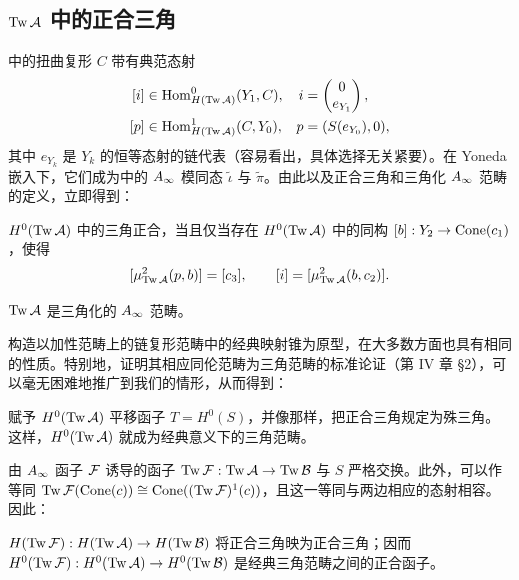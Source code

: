 \clearpage
\subsection{\texorpdfstring{$\operatorname{Tw}\mathcal A$ 中的正合三角}{TwA 中的正合三角}}\label{sec:3q}
中的扭曲复形 $C$ 带有典范态射
\begin{equation}\label{eq:3.30}
\begin{aligned}
\relax[i]&\in\operatorname{Hom}^0_{H(\operatorname{Tw}\mathcal A)}(Y_1,C),&i&=\begin{pmatrix}0\\e_{Y_1}\end{pmatrix},\\
[p]&\in\operatorname{Hom}^1_{H(\operatorname{Tw}\mathcal A)}(C,Y_0),&p&=(S(e_{Y_0}),0),
\end{aligned}
\end{equation}
其中 $e_{Y_k}$ 是 $Y_k$ 的恒等态射的链代表（容易看出，具体选择无关紧要）。在 Yoneda 嵌入下，它们成为中的 $A_\infty$ 模同态 $\tilde\iota$ 与 $\tilde\pi$。由此以及正合三角和三角化 $A_\infty$ 范畴的定义，立即得到：
\begin{lemma}\label{st:3.27}
$H^0(\operatorname{Tw}\mathcal A)$ 中的三角正合，当且仅当存在 $H^0(\operatorname{Tw}\mathcal A)$ 中的同构 $[b]:Y_2\to\operatorname{Cone}(c_1)$，使得
\[
[\mu^2_{\operatorname{Tw}\mathcal A}(p,b)]=[c_3],\qquad [i]=[\mu^2_{\operatorname{Tw}\mathcal A}(b,c_2)].
\]
\end{lemma}
\begin{lemma}\label{st:3.28}
$\operatorname{Tw}\mathcal A$ 是三角化的 $A_\infty$ 范畴。
\end{lemma}
构造以加性范畴上的链复形范畴中的经典映射锥为原型，在大多数方面也具有相同的性质。特别地，证明其相应同伦范畴为三角范畴的标准论证（第 IV 章 §2），可以毫无困难地推广到我们的情形，从而得到：
\begin{proposition}\label{st:3.29}
赋予 $H^0(\operatorname{Tw}\mathcal A)$ 平移函子 $T=H^0(S)$，并像那样，把正合三角规定为殊三角。这样，$H^0(\operatorname{Tw}\mathcal A)$ 就成为经典意义下的三角范畴。
\end{proposition}
由 $A_\infty$ 函子 $\mathcal F$ 诱导的函子 $\operatorname{Tw}\mathcal F:\operatorname{Tw}\mathcal A\to\operatorname{Tw}\mathcal B$ 与 $S$ 严格交换。此外，可以作等同 $\operatorname{Tw}\mathcal F(\operatorname{Cone}(c))\cong\operatorname{Cone}((\operatorname{Tw}\mathcal F)^1(c))$，且这一等同与两边相应的态射相容。因此：
\begin{lemma}\label{st:3.30}
$H(\operatorname{Tw}\mathcal F):H(\operatorname{Tw}\mathcal A)\to H(\operatorname{Tw}\mathcal B)$ 将正合三角映为正合三角；因而 $H^0(\operatorname{Tw}\mathcal F):H^0(\operatorname{Tw}\mathcal A)\to H^0(\operatorname{Tw}\mathcal B)$ 是经典三角范畴之间的正合函子。
\end{lemma}

